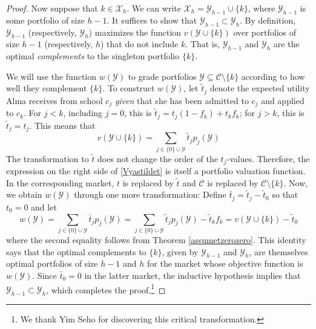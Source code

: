\documentclass[12pt]{article} %
\theoremstyle{definition}
\theoremstyle{definition}
\begin{document}
\begin{proof}
Now suppose that $k \in \mathcal{X}_h$. We can write $\mathcal{X}_h = \mathcal{Y}_{h-1} \cup \{k\}$, where $ \mathcal{Y}_{h-1}$ is some portfolio of size $h-1$. It suffices to show that $ \mathcal{Y}_{h-1} \subset \mathcal{Y}_h$. By definition, $\mathcal{Y}_{h-1}$ (respectively, $\mathcal{Y}_{h}$) maximizes the function $v(\mathcal{Y}\cup\{k\})$ over portfolios of size $h-1$ (respectively, $h$) that do not include $k$. That is, $\mathcal{Y}_{h-1}$ and $\mathcal{Y}_h$ are the optimal \emph{complements} to the singleton portfolio $\{k\}$.

We will use the function $w(\mathcal{Y})$ to grade portfolios $\mathcal{Y} \subseteq \mathcal{C} \setminus \{k\}$ according to how well they complement $\{k\}$. To construct $w(\mathcal{Y})$, let $\tilde t_j$ denote the expected utility Alma receives from school $c_j$ \emph{given} that she has been admitted to $c_j$ and applied to $c_k$. For $j < k$, including $j = 0$, this is $\tilde t_j = t_j (1- f_k) + t_k f_k$; for $j > k $, this is $\tilde t_j = t_j$. This means that 
\begin{equation}\label{Vyastildet}
v(\mathcal{Y}\cup\{k\}) = \sum_{j \in \{0\} \cup \mathcal{Y}} \tilde t_j p_j(\mathcal{Y})\end{equation}
The transformation to $\tilde t$ does not change the order of the $t_j$-values. Therefore, the expression on the right side of \eqref{Vyastildet} is itself a portfolio valuation function. In the corresponding market, $t$ is replaced by $\tilde t$ and $\mathcal{C}$ is replaced by $\mathcal{C}\setminus\{k\}$. Now, we obtain $w(\mathcal{Y})$ through one more transformation: Define $\bar t_j = \tilde t_j - \tilde t_0$ so that $t_0 = 0$ and let
\begin{equation}  \label{wYvXminusconst}
w(\mathcal{Y})
= \sum_{j \in \{0\} \cup \mathcal{Y}} \bar t_j p_j(\mathcal{Y})
= \sum_{j \in \{0\} \cup \mathcal{Y}} \tilde t_j p_j(\mathcal{Y})- \tilde t_k f_k
= v(\mathcal{Y}\cup\{k\}) - \tilde t_0 \end{equation}
where the second equality follows from Theorem \ref{assumetzerozero}. This identity says that the optimal complements to $\{k\}$, given by $\mathcal{Y}_{h-1}$ and $\mathcal{Y}_h$, are themselves optimal portfolios of size $h-1$ and $h$ for the market whose objective function is $w(\mathcal{Y})$. Since $\bar t_0 = 0$ in the latter market, the inductive hypothesis implies that $\mathcal{Y}_{h-1} \subset \mathcal{Y}_h$, which completes the proof.\footnote{We thank Yim Seho for discovering this critical transformation.}
\end{proof}
\end{document}
